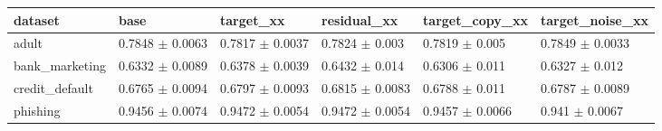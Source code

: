 \begin{tabular}{llllll}
\toprule
dataset & base & target\_xx & residual\_xx & target\_copy\_xx & target\_noise\_xx \\
\midrule
adult & 0.7848 $\pm$ 0.0063 & 0.7817 $\pm$ 0.0037 & 0.7824 $\pm$ 0.003 & 0.7819 $\pm$ 0.005 & 0.7849 $\pm$ 0.0033 \\
bank\_marketing & 0.6332 $\pm$ 0.0089 & 0.6378 $\pm$ 0.0039 & 0.6432 $\pm$ 0.014 & 0.6306 $\pm$ 0.011 & 0.6327 $\pm$ 0.012 \\
credit\_default & 0.6765 $\pm$ 0.0094 & 0.6797 $\pm$ 0.0093 & 0.6815 $\pm$ 0.0083 & 0.6788 $\pm$ 0.011 & 0.6787 $\pm$ 0.0089 \\
phishing & 0.9456 $\pm$ 0.0074 & 0.9472 $\pm$ 0.0054 & 0.9472 $\pm$ 0.0054 & 0.9457 $\pm$ 0.0066 & 0.941 $\pm$ 0.0067 \\
\bottomrule
\end{tabular}
